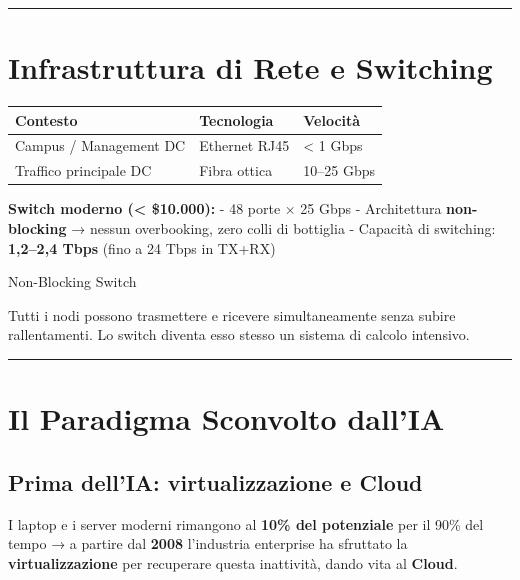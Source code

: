 \documentclass[
  italian,
  openany]{book}
\newcounter{none} %
\begin{document}
\begin{center}\rule{0.5\linewidth}{0.5pt}\end{center}

\section{Infrastruttura di Rete e
Switching}\label{infrastruttura-di-rete-e-switching}

{\def\LTcaptype{none} %
\begin{longtable}[]{@{}lll@{}}
\toprule\noalign{}
Contesto & Tecnologia & Velocità \\
\midrule\noalign{}
\endhead
\bottomrule\noalign{}
\endlastfoot
Campus / Management DC & Ethernet RJ45 & \textless{} 1 Gbps \\
Traffico principale DC & Fibra ottica & 10--25 Gbps \\
\end{longtable}
}

\textbf{Switch moderno (\textless{} \$10.000):} - 48 porte × 25 Gbps -
Architettura \textbf{non-blocking} → nessun overbooking, zero colli di
bottiglia - Capacità di switching: \textbf{1,2--2,4 Tbps} (fino a 24
Tbps in TX+RX)

\begin{calloutnote}{Non-Blocking Switch}

Tutti i nodi possono trasmettere e ricevere simultaneamente senza subire
rallentamenti. Lo switch diventa esso stesso un sistema di calcolo
intensivo.

\end{calloutnote}

\begin{center}\rule{0.5\linewidth}{0.5pt}\end{center}

\section{Il Paradigma Sconvolto
dall'IA}\label{il-paradigma-sconvolto-dallia}

\subsection{Prima dell'IA: virtualizzazione e
Cloud}\label{prima-dellia-virtualizzazione-e-cloud}

I laptop e i server moderni rimangono al \textbf{10\% del potenziale}
per il 90\% del tempo → a partire dal \textbf{2008} l'industria
enterprise ha sfruttato la \textbf{virtualizzazione} per recuperare
questa inattività, dando vita al \textbf{Cloud}.
\end{document}
